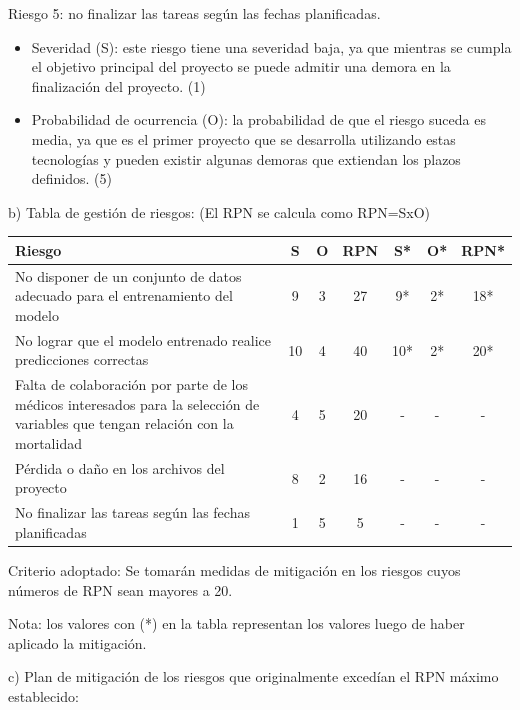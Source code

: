 \documentclass[
11pt, %
]{charter}
\begin{document}
Riesgo 5: no finalizar las tareas según las fechas planificadas.
\begin{itemize}
	\item Severidad (S): este riesgo tiene una severidad baja, ya que mientras se cumpla el objetivo principal del proyecto se puede admitir una demora en la finalización del proyecto. (1)
	\item Probabilidad de ocurrencia (O): la probabilidad de que el riesgo suceda es media, ya que es el primer proyecto que se desarrolla utilizando estas tecnologías y pueden existir algunas demoras que extiendan los plazos definidos. (5)
\end{itemize}

b) Tabla de gestión de riesgos:      (El RPN se calcula como RPN=SxO)

\begin{table}[htpb]
\centering
\begin{tabularx}{\linewidth}{@{}|X|c|c|c|c|c|c|@{}}
\hline
\rowcolor[HTML]{C0C0C0} 
Riesgo & S & O & RPN & S* & O* & RPN* \\ \hline
No disponer de un conjunto de datos adecuado para el entrenamiento del modelo & 9 & 3 & 27 & 9* & 2* & 18* \\ \hline
No lograr que el modelo entrenado realice predicciones correctas & 10 & 4 & 40 & 10* & 2* & 20* \\ \hline
Falta de colaboración por parte de los médicos interesados para la selección de variables que tengan relación con la mortalidad        & 4 & 5 & 20 & - & - & - \\ \hline
Pérdida o daño en los archivos del proyecto & 8 & 2 & 16 & - & - & - \\ \hline
No finalizar las tareas según las fechas planificadas & 1  & 5 & 5 & - & - & - \\ \hline
\end{tabularx}%
\end{table}

Criterio adoptado: 
Se tomarán medidas de mitigación en los riesgos cuyos números de RPN sean mayores a 20.

Nota: los valores con (*) en la tabla representan los valores luego de haber aplicado la mitigación.

c) Plan de mitigación de los riesgos que originalmente excedían el RPN máximo establecido:
\end{document}
